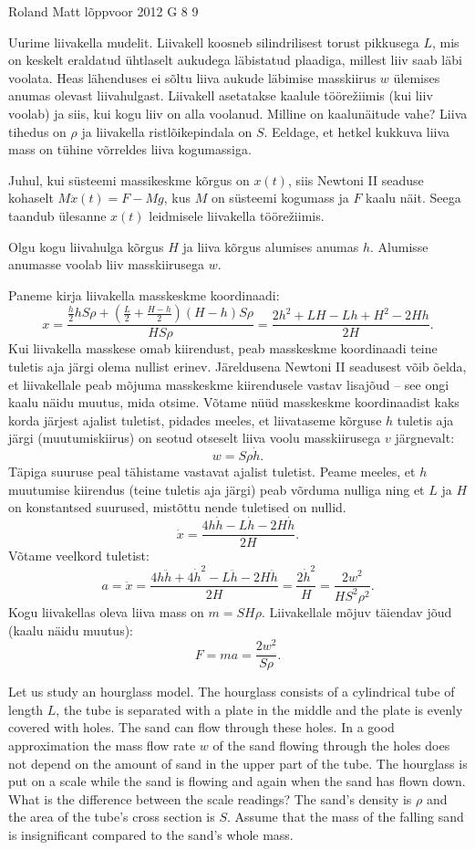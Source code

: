 {Roland Matt} %
{lõppvoor} %
{2012} %
{G 8} %
{9} %
{
\ifStatement
Uurime liivakella mudelit. Liivakell koosneb silindrilisest torust pikkusega
$L$, mis on keskelt eraldatud ühtlaselt aukudega läbistatud plaadiga, millest
liiv saab läbi voolata. Heas lähenduses ei sõltu liiva aukude läbimise
masskiirus $w$ ülemises anumas olevast liivahulgast. Liivakell asetatakse
kaalule töörežiimis (kui liiv voolab) ja siis, kui kogu liiv on alla voolanud.
Milline on kaalunäitude vahe? Liiva tihedus on $\rho$ ja liivakella
ristlõikepindala on $S$. Eeldage, et hetkel kukkuva liiva mass on tühine
võrreldes liiva kogumassiga.
\fi


\ifHint
Juhul, kui süsteemi massikeskme kõrgus on $x(t)$, siis Newtoni II seaduse kohaselt $M\ddot{x}(t) = F - Mg$, kus $M$ on süsteemi kogumass ja $F$ kaalu näit. Seega taandub ülesanne $x(t)$ leidmisele liivakella töörežiimis.
\fi


\ifSolution
Olgu kogu liivahulga kõrgus $H$ ja liiva kõrgus alumises anumas $h$. Alumisse anumasse voolab liiv masskiirusega $w$. 


Paneme kirja liivakella masskeskme koordinaadi:
\[x=\frac{\frac{h}{2}hS\rho+(\frac{L}{2}+\frac{H-h}{2})(H-h)S\rho}{HS\rho}=\frac{2h^2+LH-Lh+H^2-2Hh}{2H}.\] 
Kui liivakella masskese omab kiirendust, peab masskeskme koordinaadi teine tuletis aja järgi olema nullist erinev. Järeldusena Newtoni II seadusest võib õelda, et liivakellale peab mõjuma masskeskme kiirendusele vastav lisajõud -- see ongi kaalu näidu muutus, mida otsime.
Võtame nüüd masskeskme koordinaadist kaks korda järjest ajalist tuletist, pidades meeles, et liivataseme kõrguse $h$ tuletis aja järgi (muutumiskiirus) on seotud otseselt liiva voolu masskiirusega $v$ järgnevalt:
\[w=S\rho\dot{h}.\]
Täpiga suuruse peal tähistame vastavat ajalist tuletist. Peame meeles, et $h$ muutumise kiirendus (teine tuletis aja järgi) peab võrduma nulliga ning et $L$ ja $H$ on konstantsed suurused, mistõttu nende tuletised on nullid.
\[\dot{x}=\frac{4h\dot{h}-L\dot{h}-2H\dot{h}}{2H}.\]
Võtame veelkord tuletist:
\[a=\ddot{x}=\frac{4h\ddot{h}+4\dot{h}^2-L\ddot{h}-2H\ddot{h}}{2H}=\frac{2\dot{h}^2}{H}=\frac{2w^2}{HS^2\rho^2}.\]
Kogu liivakellas oleva liiva mass on $m=SH\rho$.
Liivakellale mõjuv täiendav jõud (kaalu näidu muutus):
\[F=ma=\frac{2w^2}{S\rho}.\]
\fi


\ifEngStatement
Let us study an hourglass model. The hourglass consists of a cylindrical tube of length $L$, the tube is separated with a plate in the middle and the plate is evenly covered with holes. The sand can flow through these holes. In a good approximation the mass flow rate $w$ of the sand flowing through the holes does not depend on the amount of sand in the upper part of the tube. The hourglass is put on a scale while the sand is flowing and again when the sand has flown down. What is the difference between the scale readings? The sand’s density is $\rho$ and the area of the tube’s cross section is $S$. Assume that the mass of the falling sand is insignificant compared to the sand’s whole mass.
\fi


}

